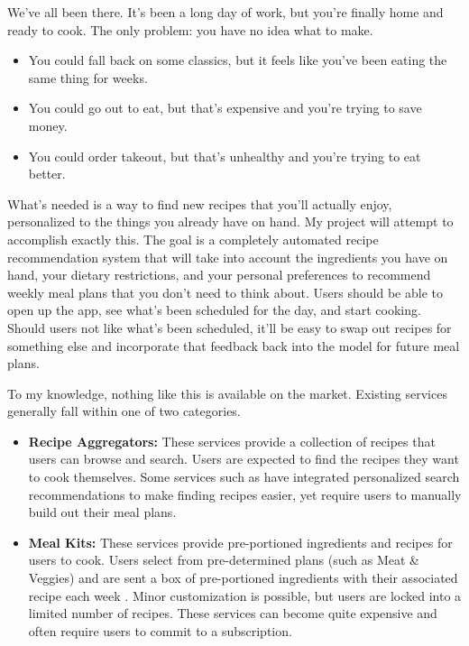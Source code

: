 \documentclass{common/ucsdreport}
\begin{document}
We've all been there. It's been a long day of work, but you're finally home and ready to cook. The only problem: you have no idea what to make.

\begin{itemize}
    \item You could fall back on some classics, but it feels like you've been eating the same thing for weeks.
    \item You could go out to eat, but that's expensive and you're trying to save money.
    \item You could order takeout, but that's unhealthy and you're trying to eat better.
\end{itemize}

What's needed is a way to find new recipes that you'll actually enjoy, personalized to the things you already have on hand. My project will attempt to accomplish exactly this. The goal is a completely automated recipe recommendation system that will take into account the ingredients you have on hand, your dietary restrictions, and your personal preferences to recommend weekly meal plans that you don't need to think about. Users should be able to open up the app, see what's been scheduled for the day, and start cooking. Should users not like what's been scheduled, it'll be easy to swap out recipes for something else and incorporate that feedback back into the model for future meal plans.

To my knowledge, nothing like this is available on the market. Existing services generally fall within one of two categories.

\begin{itemize}

    \item \textbf{Recipe Aggregators:} These services provide a collection of recipes that users can browse and search. Users are expected to find the recipes they want to cook themselves. Some services such as \citet{yummly} have integrated personalized search recommendations to make finding recipes easier, yet require users to manually build out their meal plans.

    \item \textbf{Meal Kits:} These services provide pre-portioned ingredients and recipes for users to cook. Users select from pre-determined plans (such as Meat \& Veggies) and are sent a box of pre-portioned ingredients with their associated recipe each week \citep{hellofresh}. Minor customization is possible, but users are locked into a limited number of recipes. These services can become quite expensive and often require users to commit to a subscription.

\end{itemize}
\end{document}
